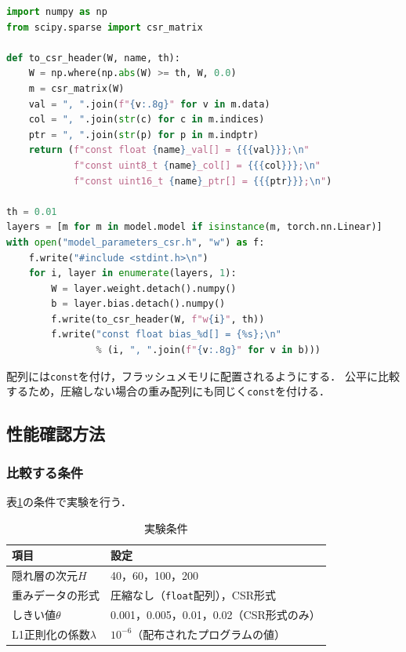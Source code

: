 \documentclass[a4paper,11pt,uplatex,dvipdfmx]{jsarticle}
\begin{document}
\begin{lstlisting}[language=Python, basicstyle=\ttfamily\small, frame=single]
import numpy as np
from scipy.sparse import csr_matrix

def to_csr_header(W, name, th):
    W = np.where(np.abs(W) >= th, W, 0.0)
    m = csr_matrix(W)
    val = ", ".join(f"{v:.8g}" for v in m.data)
    col = ", ".join(str(c) for c in m.indices)
    ptr = ", ".join(str(p) for p in m.indptr)
    return (f"const float {name}_val[] = {{{val}}};\n"
            f"const uint8_t {name}_col[] = {{{col}}};\n"
            f"const uint16_t {name}_ptr[] = {{{ptr}}};\n")

th = 0.01
layers = [m for m in model.model if isinstance(m, torch.nn.Linear)]
with open("model_parameters_csr.h", "w") as f:
    f.write("#include <stdint.h>\n")
    for i, layer in enumerate(layers, 1):
        W = layer.weight.detach().numpy()
        b = layer.bias.detach().numpy()
        f.write(to_csr_header(W, f"w{i}", th))
        f.write("const float bias_%d[] = {%s};\n"
                % (i, ", ".join(f"{v:.8g}" for v in b)))
\end{lstlisting}

配列には\texttt{const}を付け，フラッシュメモリに配置されるようにする．
公平に比較するため，圧縮しない場合の重み配列にも同じく\texttt{const}を付ける．

\subsection{性能確認方法}

\subsubsection{比較する条件}

表\ref{tab:cond}の条件で実験を行う．

\begin{table}[h]
  \centering
  \caption{実験条件}
  \label{tab:cond}
  \begin{tabular}{ll}
    \toprule
    項目 & 設定 \\
    \midrule
    隠れ層の次元$H$ & 40，60，100，200 \\
    重みデータの形式 & 圧縮なし（\texttt{float}配列），CSR形式 \\
    しきい値$\theta$ & 0.001，0.005，0.01，0.02（CSR形式のみ） \\
    L1正則化の係数$\lambda$ & $10^{-6}$（配布されたプログラムの値） \\
    \bottomrule
  \end{tabular}
\end{table}
\end{document}
